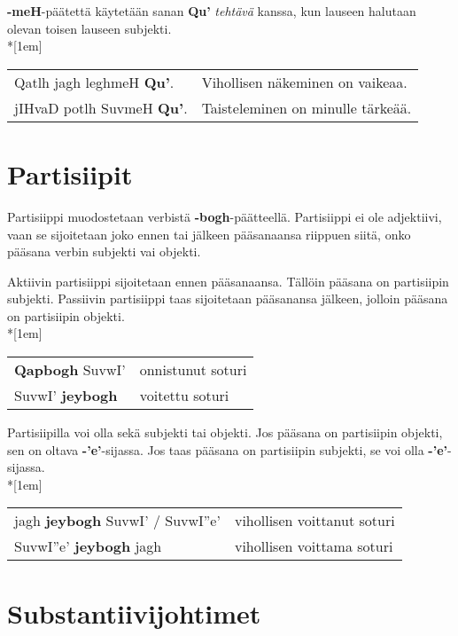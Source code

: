 \documentclass{book}
\begin{document}
\textbf{-meH}-päätettä käytetään sanan \textbf{Qu'} \textit{tehtävä} kanssa, kun lauseen halutaan olevan toisen lauseen subjekti.\\*[1em]
\begin{tabular}{l l}
    Qatlh jagh leghmeH \textbf{Qu'}. & Vihollisen näkeminen on vaikeaa. \\
    jIHvaD potlh SuvmeH \textbf{Qu'}. & Taisteleminen on minulle tärkeää. \\
\end{tabular}

\section{Partisiipit}

Partisiippi muodostetaan verbistä \textbf{-bogh}-päätteellä.
Partisiippi ei ole adjektiivi, vaan se sijoitetaan joko ennen tai jälkeen pääsanaansa riippuen siitä, onko pääsana verbin subjekti vai objekti.

Aktiivin partisiippi sijoitetaan ennen pääsanaansa.
Tällöin pääsana on partisiipin subjekti.
Passiivin partisiippi taas sijoitetaan pääsanansa jälkeen, jolloin pääsana on partisiipin objekti.\\*[1em]
\begin{tabular}{l l}
    \textbf{Qapbogh} SuvwI' & onnistunut soturi \\
    SuvwI' \textbf{jeybogh} & voitettu soturi \\
\end{tabular}

Partisiipilla voi olla sekä subjekti tai objekti.
Jos pääsana on partisiipin objekti, sen on oltava \textbf{-'e'}-sijassa.
Jos taas pääsana on partisiipin subjekti, se voi olla \textbf{-'e'}-sijassa.\\*[1em]
\begin{tabular}{l l}
    jagh \textbf{jeybogh} SuvwI' / SuvwI''e' & vihollisen voittanut soturi \\
    SuvwI''e' \textbf{jeybogh} jagh & vihollisen voittama soturi \\
\end{tabular}

\section{Substantiivijohtimet}
\end{document}
